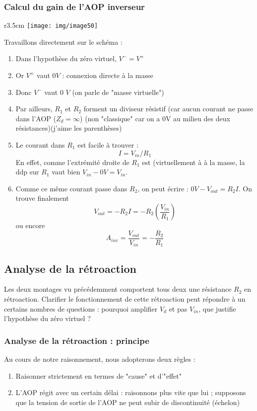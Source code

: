 \subsubsection{Calcul du gain de l'AOP inverseur}
\begin{wrapfigure}[8]{r}{3.5cm}
	\texttt{[image: img/image50]}
\end{wrapfigure}
Travaillons directement sur le schéma :
\begin{enumerate}
	\item Dans l'hypothèse du zéro virtuel, $V^- = V^+$
	\item Or $V^+$ vaut $0V$ : connexion directe à la masse
	\item Donc $V^-$ vaut 0 $V$ (on parle de "masse virtuelle")
	\item Par ailleurs, $R_1$ et $R_2$ forment un diviseur résistif (car aucun courant ne passe dans l'AOP ($Z_d = \infty$) (non "classique" car on a 0V au milieu des deux résistances)(j'aime les parenthèses)
	\item Le courant dans $R_1$ est facile à trouver :
	      \begin{equation}
	      	I = V_{in}/R_1
	      \end{equation}
	      En effet, comme l'extrémité droite de $R_1$ est (virtuellement à à la masse, la ddp sur $R_1$ vaut bien $V_{in}-0V = V_{in}$.
	\item Comme ce même courant passe dans $R_2$, on peut écrire : $0V-V_{out} = R_2I$. On trouve finalement
	      \begin{equation}
	      	V_{out} = -R_2I = -R_2\left(\frac{V_{in}}{R_1}\right)
	      \end{equation}
	      ou encore
	      \begin{equation}
	      	A_{inv} = \frac{V_{out}}{V_{in}} = - \frac{R_2}{R_1}
	      \end{equation}
\end{enumerate}


\subsection{Analyse de la rétroaction}
Les deux montages vu précédemment comportent tous deux une résistance $R_2$ en rétroaction. Clarifier le fonctionnement de cette rétroaction peut répondre à un certains nombres de questions : pourquoi amplifier $V_d$ et pas $V_{in}$, que justifie l'hypothèse du zéro virtuel ?

\subsubsection{Analyse de la rétroaction : principe}
Au cours de notre raisonnement, nous adopterons deux règles :
\begin{enumerate}
	\item Raisonner strictement en termes de "cause" et d'"effet"
	\item L'AOP régit avec un certain délai : raisonnons plus vite que lui ; supposons que la tension de sortie de l'AOP ne peut subir de discontinuité (échelon)
\end{enumerate}


